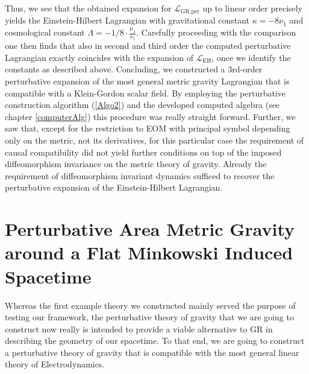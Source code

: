 Thus, we see that the obtained expansion for $\mathcal{L}_{\text{GR,per}}$ up to linear order precisely yields the Einstein-Hilbert Lagrangian with gravitational constant $\kappa = -8 \nu_1$ and cosmological constant $\Lambda = -1/8 \cdot \frac{\mu_1}{\nu_1}$. Carefully proceeding with the comparison one then finds that also in second and third order the computed perturbative Lagrangian exactly coincides with the expansion of $\mathcal{L}_{\text{EH}}$, once we identify the constants as described above. 
Concluding, we constructed a $3$rd-order perturbative expansion of the most general metric gravity Lagrangian that is compatible with a Klein-Gordon scalar field. By employing the perturbative construction algorithm (\ref{Algo2}) and the developed computed algebra (see chapter \ref{computerAlg}) this procedure was really straight forward. 
Further, we saw that, except for the restriction to EOM with principal symbol depending only on the metric, not its derivatives, for this particular case the requirement of causal compatibility did not yield further conditions on top of the imposed diffeomorphism invariance on the metric theory of gravity.
Already the requirement of diffeomorphism invariant dynamics sufficed to recover the perturbative expansion of the Einstein-Hilbert Lagrangian.

\section{Perturbative Area Metric Gravity around a Flat Minkowski Induced Spacetime}
Whereas the first example theory we constructed mainly served the purpose of testing our framework, the perturbative theory of gravity that we are going to construct now really is intended to provide a viable alternative to GR in describing the geometry of our spacetime.  
To that end, we are going to construct a perturbative theory of gravity that is compatible with the most general linear theory of Electrodynamics. 

